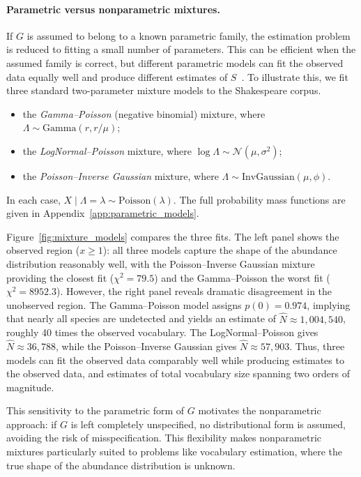 ﻿\documentclass{article}
\begin{document}
\paragraph{Parametric versus nonparametric mixtures.}
If $G$ is assumed to belong to a known parametric family, the estimation problem is reduced to fitting a small number of parameters. This can be efficient when the assumed family is correct, but different parametric models can fit the observed data equally well and produce different estimates of $S$~\cite{chao2016species}. To illustrate this, we fit three standard two-parameter mixture models to the Shakespeare corpus.
\begin{itemize}
    \item the \emph{Gamma--Poisson} (negative binomial) mixture, where
          $\Lambda \sim \mathrm{Gamma}(r, r/\mu)$;
    \item the \emph{LogNormal--Poisson} mixture, where
          $\log\Lambda \sim \mathcal{N}(\mu, \sigma^2)$;
    \item the \emph{Poisson--Inverse Gaussian} mixture, where
          $\Lambda \sim \mathrm{InvGaussian}(\mu, \phi)$.
\end{itemize}
In each case, $X \mid \Lambda = \lambda \sim \mathrm{Poisson}(\lambda)$.
The full probability mass functions are given in Appendix~\ref{app:parametric_models}.

Figure~\ref{fig:mixture_models} compares the three fits. The left panel shows the observed region ($x \geq 1$): all three models capture the shape of the abundance distribution reasonably well, with the Poisson--Inverse Gaussian mixture providing the closest fit ($\chi^2 = 79.5$) and the Gamma--Poisson the worst fit ($\chi^2 = 8952.3$). However, the right panel reveals dramatic disagreement in the unobserved region. The Gamma--Poisson model assigns $p(0) = 0.974$, implying that nearly all species are undetected and yields an estimate of $\hat{N} \approx 1{,}004{,}540$, roughly 40 times the observed vocabulary. The LogNormal--Poisson gives $\hat{N} \approx 36{,}788$, while the Poisson--Inverse Gaussian gives $\hat{N} \approx 57{,}903$. Thus, three models can fit the observed data comparably well while producing estimates to the observed data, and estimates of total vocabulary size spanning two orders of magnitude.

\vspace{1em}

This sensitivity to the parametric form of $G$ motivates the nonparametric approach: if $G$ is left completely unspecified, no distributional form is assumed, avoiding the risk of misspecification. This flexibility makes nonparametric mixtures particularly suited to problems like vocabulary estimation, where the true shape of the abundance distribution is unknown.
\end{document}
